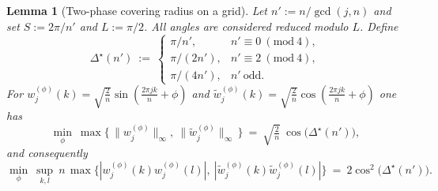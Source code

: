 \documentclass[12pt,fleqn]{amsart}
\newtheorem{lem}[thm]{Lemma}
\theoremstyle{definition}
\theoremstyle{remark}
\newcommand{\1}{\mathbf{1}}
\begin{document}
\begin{lem}[Two-phase covering radius on a grid]\label{lem:twophase}
Let $n':=n/\gcd(j,n)$ and set $S:=2\pi/n'$ and $L:=\pi/2$. All angles are considered reduced modulo $L$. Define
\[
\Delta^\star(n')\ :=\
\begin{cases}
\pi/n',     & n'\equiv 0\ (\mathrm{mod}\ 4),\\[1mm]
\pi/(2n'),  & n'\equiv 2\ (\mathrm{mod}\ 4),\\[1mm]
\pi/(4n'),  & n'\ \mathrm{odd}.
\end{cases}
\]
For $w^{(\phi)}_j(k)=\sqrt{\tfrac{2}{n}}\sin(\tfrac{2\pi jk}{n}+\phi)$ and
$\tilde w^{(\phi)}_j(k)=\sqrt{\tfrac{2}{n}}\cos(\tfrac{2\pi jk}{n}+\phi)$ one has
\[
\min_{\phi}\ \max\!\Big\{\,\|w^{(\phi)}_j\|_\infty,\ \|\tilde w^{(\phi)}_j\|_\infty\,\Big\}
\ =\ \sqrt{\tfrac2n}\ \cos\big(\Delta^\star(n')\big),
\]
and consequently
\[
\min_{\phi}\ \sup_{k,l}\ n\,\max\{|w^{(\phi)}_j(k)w^{(\phi)}_j(l)|,\ |\tilde w^{(\phi)}_j(k)\tilde w^{(\phi)}_j(l)|\}
\ =\ 2\cos^2\big(\Delta^\star(n')\big).
\]
\end{lem}
\end{document}
